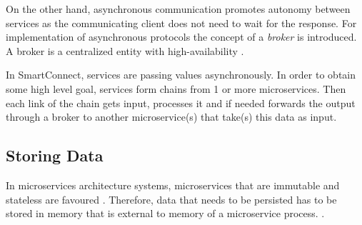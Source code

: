 On the other hand, asynchronous communication promotes autonomy between services as the communicating client does not need to wait for the response. 
For implementation of asynchronous protocols the concept of a \textit{broker} is introduced. A broker is a centralized entity with high-availability \cite{indrasiri2018microservices}.

In SmartConnect, services are passing values asynchronously. In order to obtain some high level goal, services form chains from 1 or more microservices. Then each link of the chain gets input, processes it and if needed forwards the output through a broker to another microservice(s) that take(s) this data as input.

\subsection{Storing Data}
In microservices architecture systems, microservices that are immutable and stateless are favoured \cite{indrasiri2018microservices}. Therefore, data that needs to be persisted has to be stored in memory that is external to memory of a microservice process.
.
